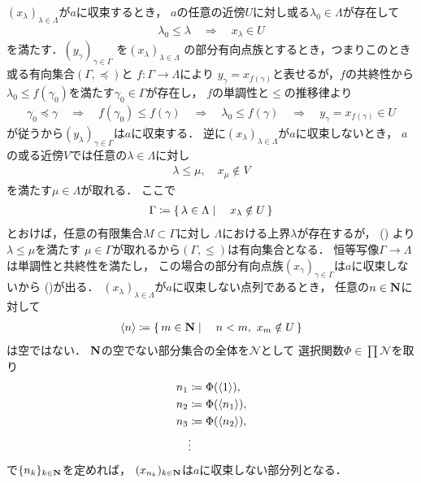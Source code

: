 	\begin{prf}
				$(x_\lambda)_{\lambda \in \Lambda}$が$a$に収束するとき，
				$a$の任意の近傍$U$に対し或る$\lambda_0 \in \Lambda$が存在して
				\begin{align}
					\lambda_0 \leq \lambda
					\quad \Longrightarrow \quad
					x_\lambda \in U
				\end{align}
				を満たす．$(y_\gamma)_{\gamma \in \Gamma}$
				を$(x_\lambda)_{\lambda \in \Lambda}$
				の部分有向点族とするとき，つまりこのとき或る有向集合$(\Gamma,\preceq)$と
				$f:\Gamma \longrightarrow \Lambda$により
				$y_\gamma = x_{f(\gamma)}$と表せるが，$f$の共終性から
				$\lambda_0 \leq f(\gamma_0)$を満たす$\gamma_0 \in \Gamma$が存在し，
				$f$の単調性と$\leq$の推移律より
				\begin{align}
					\gamma_0 \preceq \gamma
					\quad \Longrightarrow \quad
					f(\gamma_0) \leq f(\gamma)
					\quad \Longrightarrow \quad
					\lambda_0 \leq f(\gamma)
					\quad \Longrightarrow \quad
					y_\gamma = x_{f(\gamma)} \in U
				\end{align}
				が従うから$(y_\lambda)_{\gamma \in \Gamma}$は$a$に収束する．
				逆に$(x_\lambda)_{\lambda \in \Lambda}$が$a$に収束しないとき，
				$a$の或る近傍$V$では任意の$\lambda \in \Lambda$に対し
				\begin{align}
					\lambda \leq \mu,
					\quad x_\mu \notin V
					\label{eq:thm_a_net_converges_iff_every_subnet_converges_1}
				\end{align}
				を満たす$\mu \in \Lambda$が取れる．
				ここで
				\begin{align}
					\Gamma \coloneqq \left\{\, \lambda \in \Lambda \mid \quad x_\lambda \notin U\, \right\}
				\end{align}
				とおけば，任意の有限集合$M \subset \Gamma$に対し
				$\Lambda$における上界$\lambda$が存在するが，
				()
				より$\lambda \leq \mu$を満たす
				$\mu \in \Gamma$が取れるから$(\Gamma,\leq)$は有向集合となる．
				恒等写像$\Gamma \longrightarrow \Lambda$は単調性と共終性を満たし，
				この場合の部分有向点族$(x_\gamma)_{\gamma \in \Gamma}$は$a$に収束しないから
				()が出る．
				$(x_\lambda)_{\lambda \in \Lambda}$が$a$に収束しない点列であるとき，
				任意の$n \in \mathbf{N}$に対して
				\begin{align}
					\inprod<n> \coloneqq
					\Set{m \in \N}{n < m,\ x_m \notin U}
				\end{align}
				は空ではない．
				$\mathbf{N}$の空でない部分集合の全体を$\mathscr{N}$として
				選択関数$\Phi \in \prod \mathscr{N}$を取り
				\begin{align}
					n_1 &\coloneqq \Phi(\inprod<1>), \\
					n_2 &\coloneqq \Phi(\inprod<n_1>), \\
					n_3 &\coloneqq \Phi(\inprod<n_2>), \\
					&\vdots
				\end{align}
				で$\{n_k\}_{k \in \mathbf{N}}$を定めれば，
				$(x_{n_k})_{k \in \mathbf{N}}$は$a$に収束しない部分列となる．
				\QED
	\end{prf}
	
